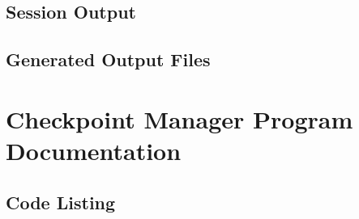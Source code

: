 \documentclass{article}
\begin{document}
\subsection{Session Output}

\subsection{Generated Output Files}

\section{Checkpoint Manager Program Documentation}

\subsection{Code Listing}

















\end{document}
